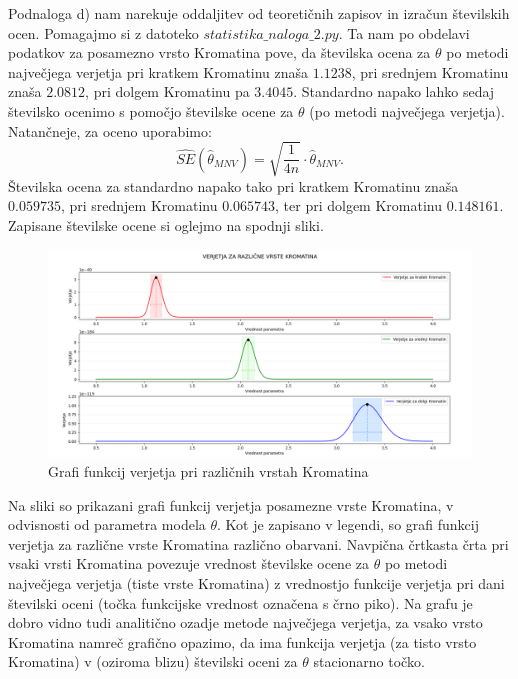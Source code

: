\documentclass{article}
\begin{document}
\newline
\newline
Podnaloga d) nam narekuje oddaljitev od teoretičnih zapisov in izračun številskih ocen. Pomagajmo si z datoteko $statistika\_naloga\_2.py$. 
Ta nam po obdelavi podatkov za posamezno vrsto Kromatina pove, da številska ocena za $\theta$ po metodi največjega verjetja pri kratkem Kromatinu znaša $1.1238$, pri srednjem Kromatinu znaša $2.0812$, pri dolgem Kromatinu pa $3.4045$.
Standardno napako lahko sedaj številsko ocenimo s pomočjo številske ocene za $\theta$ (po metodi največjega verjetja). Natančneje, za oceno uporabimo:
$$
    \hat{SE}(\hat{\theta}_{MNV}) = \sqrt{\frac{1}{4n}} \cdot\hat{\theta}_{MNV}.
$$
Številska ocena za standardno napako tako pri kratkem Kromatinu znaša $0.059735$, pri srednjem Kromatinu $0.065743$, ter pri dolgem Kromatinu $0.148161$.
Zapisane številske ocene si oglejmo na spodnji sliki. 
\begin{figure}[H]
    \begin{center}
    \includegraphics[width=\linewidth]{naloga2d.png}
    \vspace*{-5mm}\caption{Grafi funkcij verjetja pri različnih vrstah Kromatina}
    \end{center}    
\end{figure}
Na sliki so prikazani grafi funkcij verjetja posamezne vrste Kromatina, v odvisnosti od parametra modela $\theta$. Kot je zapisano v legendi, so grafi funkcij verjetja za različne vrste Kromatina različno obarvani. 
Navpična črtkasta črta pri vsaki vrsti Kromatina povezuje vrednost številske ocene za $\theta$ po metodi največjega verjetja (tiste vrste Kromatina) z vrednostjo funkcije verjetja pri dani številski oceni (točka funkcijske vrednost označena s črno piko).
Na grafu je dobro vidno tudi analitično ozadje metode največjega verjetja, za vsako vrsto Kromatina namreč grafično opazimo, da ima funkcija verjetja (za tisto vrsto Kromatina) v (oziroma blizu) številski oceni za $\theta$ stacionarno točko. 
\end{document}
